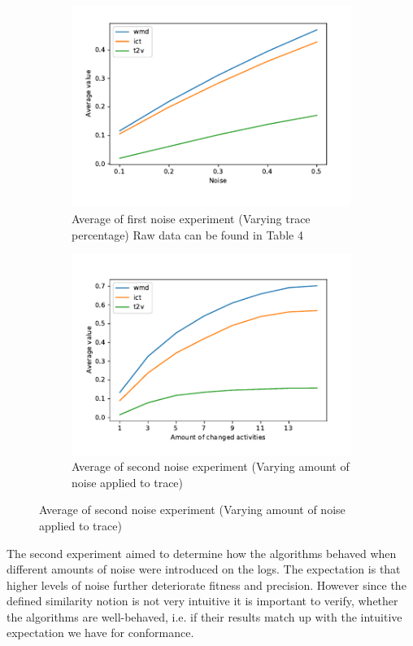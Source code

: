 \documentclass[runningheads]{template/llncs}
\begin{document}
\begin{figure}
	\centering
	\begin{subfigure}[b]{0.49\textwidth}
		\centering
		\includegraphics[width=\textwidth]{figures/noise-first}
		\caption{Average of first noise experiment (Varying trace percentage) Raw data can be found in \cite{PBWe20} Table 4}
		\label{fig:noise-first}
	\end{subfigure}
	\hfill
	\begin{subfigure}[b]{0.49\textwidth}
		\centering
		\includegraphics[width=\textwidth]{figures/noise-second}
		\caption{Average of second noise experiment (Varying amount of noise applied to trace)}
		\label{fig:noise-second}
	\end{subfigure}
\end{figure}
The second experiment aimed to determine how the algorithms behaved when different amounts of noise were introduced on the logs.
The expectation is that higher levels of noise further deteriorate fitness and precision. 
However since the defined similarity notion is not very intuitive it is important to verify, whether the algorithms are well-behaved, i.e. if their results match up with the intuitive expectation we have for conformance.
\end{document}

